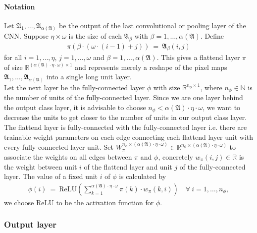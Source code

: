 \documentclass{article}
\begin{document}
\paragraph{Notation}
Let $\mathfrak{A}_1, \ldots, \mathfrak{A}_{\alpha(\mathfrak{A})}$ be the output of the last convolutional or pooling layer of the CNN. Suppose $\eta \times \omega$ is the size of each $\mathfrak{A}_{\beta}$ with $\beta=1, \ldots, \alpha(\mathfrak{A})$. Define
\begin{align}
\pi\left(\beta \cdot ( \omega \cdot (i-1) + j)\right) \ = \ \mathfrak{A}_\beta(i,j)
\end{align}
for all $i=1, \ldots, \eta$, $j=1, \ldots, \omega$ and $\beta =1, \ldots, \alpha(\mathfrak{A})$. This gives a flattend layer $\pi$ of size $\mathbb{R}^{\left(\alpha(\mathfrak{A})\cdot\eta\cdot\omega\right) \times 1}$ and represents merely a reshape of the pixel maps $\mathfrak{A}_1, \ldots, \mathfrak{A}_{\alpha(\mathfrak{A})}$ into a single long unit layer.\\
Let the next layer be the fully-connected layer $\phi$ with size $\mathbb{R}^{n_{\phi} \times 1}$, where $n_{\phi} \in \mathbb{N}$ is the number of units of the fully-connected layer. Since we are one layer behind the output class layer, it is advisable to choose $n_{\phi} < \alpha(\mathfrak{A})\cdot \eta \cdot \omega$, we want to decrease the units to get closer to the number of units in our output class layer. The flattend layer is fully-connected with the fully-connected layer i.e. there are trainable weight parameters on each edge connecting each flattend layer unit with every fully-connected layer unit. Set $W^{n_\phi \times \left(\alpha(\mathfrak{A})\cdot\eta \cdot \omega\right)}_\pi \in \mathbb{R}^{n_\phi \times \left(\alpha(\mathfrak{A})\cdot\eta \cdot \omega\right)}$ to associate the weights on all edges between $\pi$ and $\phi$, concretely $w_\pi(i,j) \in \mathbb{R}$ is the weight between unit $i$ of the flattend layer and unit $j$ of the fully-connected layer. The value of a fixed unit $i$ of $\phi$ is calculated by
\begin{align}
\phi(i) \ = \ \text{ReLU} \left( \sum_{k=1}^{\alpha(\mathfrak{A}) \cdot \eta \cdot \omega} \pi(k) \cdot w_\pi (k,i) \right) \quad \forall \ i=1, \ldots, n_\phi,
\end{align}
we choose ReLU to be the activation function for $\phi$.

\subsubsection{Output layer}
\end{document}

